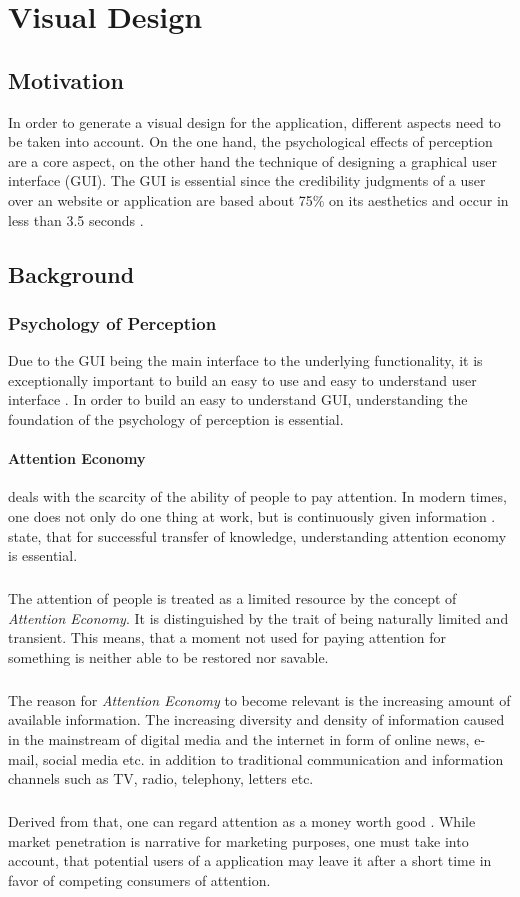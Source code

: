 \section{Visual Design}
\subsection{Motivation}
In order to generate a visual design for the application, different aspects need to be taken into account. On the one hand, the psychological effects of perception are a core aspect, on the other hand the technique of designing a graphical user interface (GUI). The GUI is essential since the credibility judgments of a user over an website or application are based about 75\% on its aesthetics and occur in less than 3.5 seconds \parencite[cf.][1]{Alsudani.2009}.
\subsection{Background}
\subsubsection{Psychology of Perception}
Due to the GUI being the main interface to the underlying functionality, it is exceptionally important to build an easy to use and easy to understand user interface \parencite[cf.][2]{Dray.1995}. In order to build an easy to understand GUI, understanding the foundation of the psychology of perception is essential.
\paragraph{Attention Economy} deals with the scarcity of the ability of people to pay attention. In modern times, one does not only do one thing at work, but is continuously given information  \parencite[cf.][]{Davenport.2001}. \textcite{Davenport.2001} state, that for successful transfer of knowledge, understanding attention economy is essential. 
\subparagraph*{} The attention of people is treated as a limited resource by the concept of \textit{Attention Economy}. It is distinguished by the trait of being naturally limited and transient. This means, that a moment not used for paying attention for something is neither able to be restored nor savable. \parencite[cf.][]{Davenport.2001}
\subparagraph*{} The reason for \textit{Attention Economy} to become relevant is the increasing amount of available information. The increasing diversity and density of information caused in the mainstream of digital media and the internet in form of online news, e-mail, social media etc. in addition to traditional communication and information channels such as TV, radio, telephony, letters etc.
\subparagraph*{} Derived from that, one can regard attention as a money worth good \parencite[cf.][]{Davenport.2001}. While market penetration is narrative for marketing purposes, one must take into account, that potential users of a application may leave it after a short time in favor of competing consumers of attention.
